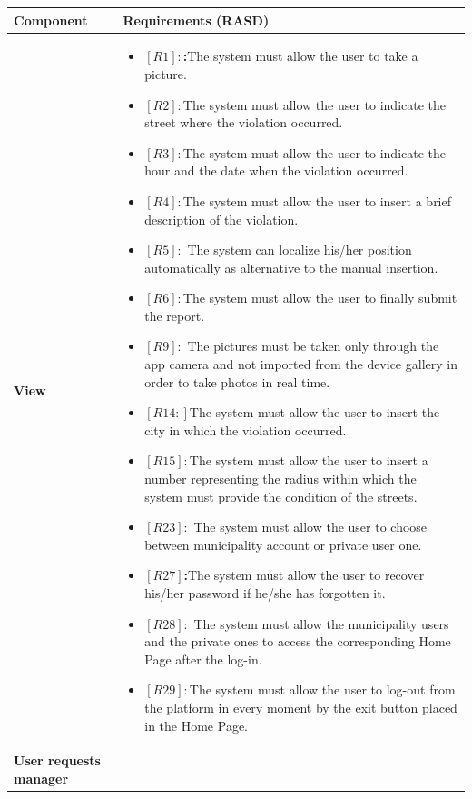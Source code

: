 \documentclass[titlepage]{article}
\begin{document}
\begin{longtable}{| p{7 cm} | p{8 cm} |} \hline
		Component  & Requirements (RASD) 
		 \\ \hline
		\newline \textbf {View} &
		\begin{itemize}
		\item \textbf{$[R1]:$:}The system must allow the user to take a picture. 
		\item \textbf{$[R2]:$}The system must allow the user to indicate the street where the violation occurred. 
		\item \textbf{$[R3]:$}The system must allow the user to indicate the hour and the date when the violation occurred. 
		\item \textbf{$[R4]:$}The system must allow the user to insert a brief description of the violation. 
		\item \textbf{$[R5]:$} The system can localize his/her position automatically as alternative to the manual insertion.
		 \item \textbf{$[R6]:$}The system must allow the user to finally submit the report. 
		 \item \textbf{$[R9]:$} The pictures must be taken only through the app camera and not imported from the device gallery in order to take photos in real time. 
		 \item \textbf{$[R14:]$}The system must allow the user to insert the city in which the violation occurred. 
		 \item \textbf{$[R15]:$}The system must allow the user to insert a number representing the radius within which the system must provide the condition of the streets.
		 \item \textbf{$[R23]:$} The system must allow the user to choose between municipality account or private user one. 
		 \item \textbf{$[R27]$:}The system must allow the user to recover his/her password if he/she has forgotten it.
		 \item \textbf{$[R28]:$} The system must allow the municipality users and the private ones to access the corresponding Home Page after the log-in. 
		 \item \textbf{$[R29]:$}The system must allow the user to log-out from the platform in every moment by the exit button placed in the Home Page. 
	\end{itemize} \\ \hline
		\newline \textbf {User requests manager} &
		\begin{itemize}

\end{itemize}
\end{longtable}
\end{document}
